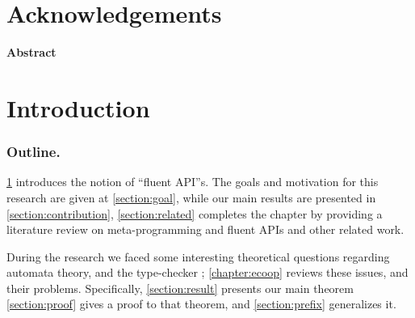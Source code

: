 \documentclass[12pt]{book}
\begin{document}
\maketitle
\frontmatter

\chapter*{Acknowledgements}
\label{chapter:acknowledgements}


\cleardoublepage{}
\begin{centering}
  \hfill \Large\bfseries Abstract\hfill
\end{centering}
\begin{quote}
  \slshape
  \large
  
\end{quote}

\tableofcontents
\cleardoublepage{}
{}
\listoftables
\cleardoublepage{}
{}
\cleardoublepage{}
\listoffigures
\cleardoublepage{}
{}
\listofalgorithms
\cleardoublepage{}
{}
\lstlistoflistings

\mainmatter

\chapter{Introduction}
\label{chapter:introduction}


\subsection*{Outline.}

\cref{chapter:introduction} introduces the notion of ``fluent API''s.  The
goals and motivation for this research are given at \cref{section:goal},
while our main results are presented in \cref{section:contribution},
\cref{section:related} completes the chapter by providing a literature review
on meta-programming and fluent APIs and other related work.

During the research we faced some interesting theoretical questions regarding
automata theory, and the \Java type-checker ; \cref{chapter:ecoop} reviews
these issues, and their problems. Specifically, \cref{section:result} presents
our main theorem \cref{section:proof} gives a proof to that theorem, and
\cref{section:prefix} generalizes it.
\end{document}
